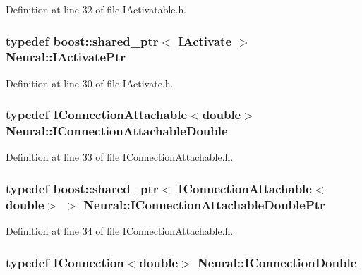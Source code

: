 Definition at line 32 of file IActivatable.h.

\hypertarget{namespace_neural_aa317acf32f01510e99627087e14785c1}{
\subsubsection[{IActivatePtr}]{\setlength{\rightskip}{0pt plus 5cm}typedef boost::shared\_\-ptr$<$ {\bf IActivate} $>$ {\bf Neural::IActivatePtr}}}
\label{namespace_neural_aa317acf32f01510e99627087e14785c1}


Definition at line 30 of file IActivate.h.

\hypertarget{namespace_neural_a1c06538a2d859c6085e54d09f3ffbfe7}{
\subsubsection[{IConnectionAttachableDouble}]{\setlength{\rightskip}{0pt plus 5cm}typedef {\bf IConnectionAttachable}$<$double$>$ {\bf Neural::IConnectionAttachableDouble}}}
\label{namespace_neural_a1c06538a2d859c6085e54d09f3ffbfe7}


Definition at line 33 of file IConnectionAttachable.h.

\hypertarget{namespace_neural_aa1aecf50940c2cf448c01da3a4260153}{
\subsubsection[{IConnectionAttachableDoublePtr}]{\setlength{\rightskip}{0pt plus 5cm}typedef boost::shared\_\-ptr$<$ {\bf IConnectionAttachable}$<$double$>$ $>$ {\bf Neural::IConnectionAttachableDoublePtr}}}
\label{namespace_neural_aa1aecf50940c2cf448c01da3a4260153}


Definition at line 34 of file IConnectionAttachable.h.

\hypertarget{namespace_neural_a9fd82ddb78d2599e07b1b9767d2c05dd}{
\subsubsection[{IConnectionDouble}]{\setlength{\rightskip}{0pt plus 5cm}typedef {\bf IConnection}$<$double$>$ {\bf Neural::IConnectionDouble}}}
\label{namespace_neural_a9fd82ddb78d2599e07b1b9767d2c05dd}


